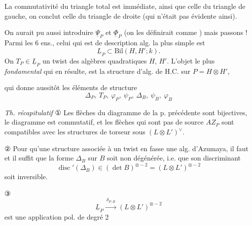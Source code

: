 \documentclass[11pt,a4paper]{article}
\begin{document}

La commutativité du triangle total est immédiate, ainsi que celle du triangle de gauche,  on conclut celle du triangle de droite (qui n'était pas évidente ainsi).

 On aurait pu aussi introduire $\underline{\Psi}_P$ et $\underline{\Phi}_P$ (on les définirait comme ) mais passons ! Parmi les 6 \struck{\ill{}} ens., celui qui est de description alg. la plus simple est
\[ \underline{L}_P \subset \mathrm{Bil}(H,H';k) . \]
On   $T_P\in\underline{L}_P$ un twist \struck{\ill{}} des algèbres \struck{\ill{}} quadratiques $H$, $H'$. L'objet le plus \emph{fondamental} qui en résulte, est la structure d'alg. de H.C. sur $P = H\otimes H'$,

qui donne aussitôt les éléments de structure
\[ \Delta_P,\ T_P,\ \varphi_P,\ \psi_P,\ \Delta_B,\ \psi_B,\ \varphi_B \]

\emph{Th. récapitulatif} ① Les flèches du diagramme de la p. précédente sont bijectives, le diagramme est commutatif, et les  flèches qui  sont pas de source $AZ_P$ sont compatibles avec les structures de torseur sous $(L\otimes L')^{\vee}$.

② Pour qu'une structure  associée à un twist en fasse une alg. d'Azumaya, il faut et il suffit que la forme $\Delta_B$ sur $B$ soit non dégénérée, i.e. que son discriminant
\[ \operatorname{disc}'(\Delta_B) \in (\det B)^{\otimes-2} = (L\otimes L')^{\otimes-2} \]
soit inversible.

③
\[ \underline{L}_P \xrightarrow{\ \delta_{P,B}\ } (L\otimes L')^{\otimes-2} \]
est une application  pol. de degré 2
\end{document}
